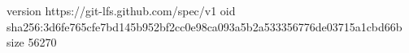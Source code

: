 version https://git-lfs.github.com/spec/v1
oid sha256:3d6fe765cfe7bd145b952bf2cc0e98ca093a5b2a533356776de03715a1cbd66b
size 56270
